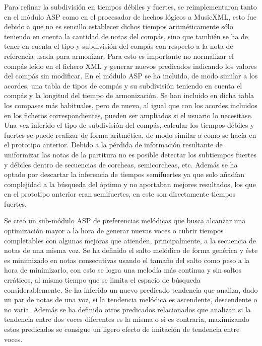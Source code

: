 Para refinar la subdivisión en tiempos débiles y fuertes, se reimplementaron tanto en el módulo ASP como en el procesador de hechos lógicos a MusicXML, esto fue debido a que no es sencillo establecer dichos tiempos aritméticamente sólo teniendo en cuenta la cantidad de notas del compás, sino que también se ha de tener en cuenta el tipo y subdivisión del compás con respecto a la nota de referencia usada para armonizar. Para esto es importante no normalizar el compás leído en el fichero XML y generar nuevos predicados indicando los valores del compás sin modificar. En el módulo ASP se ha incluido, de modo similar a los acordes, una tabla de tipos de compás y su subdivisión teniendo en cuenta el compás y la longitud del tiempo de armonización. Se han incluido en dicha tabla los compases más habituales, pero de nuevo, al igual que con los acordes incluidos en los ficheros correspondientes, pueden ser ampliados si el usuario lo necesitase. Una vez inferido el tipo de subdivisión del compás, calcular los tiempos débiles y fuertes se puede realizar de forma aritmética, de modo similar a como se hacía en el prototipo anterior. Debido a la pérdida de información resultante de uniformizar las notas de la partitura no es posible detectar los subtiempos fuertes y débiles dentro de secuencias de corcheas, semicorcheas, etc. Además se ha optado por descartar la inferencia de tiempos semifuertes ya que solo añadían complejidad a la búsqueda del óptimo y no aportaban mejores resultados, los que en el prototipo anterior eran semifuertes, en este son directamente tiempos fuertes.

Se creó un sub-módulo ASP de preferencias melódicas que busca alcanzar una optimización mayor a la hora de generar nuevas voces o cubrir tiempos completables con algunas mejoras que atienden, principalmente, a la secuencia de notas de una misma voz. Se ha definido el salto melódico de forma genérica y éste es minimizado en notas consecutivas usando el tamaño del salto como peso a la hora de minimizarlo, con esto se logra una melodía más continua y sin saltos erráticos, al mismo tiempo que se limita el espacio de búsqueda considerablemente. Se ha inferido un nuevo predicado tendencia que analiza, dado un par de notas de una voz, si la tendencia melódica es ascendente, descendente o no varía. Además se ha definido otros predicados relacionados que analizan si la tendencia entre dos voces diferentes es la misma o si es contraria, maximizando estos predicados se consigue un ligero efecto de imitación de tendencia entre voces.


